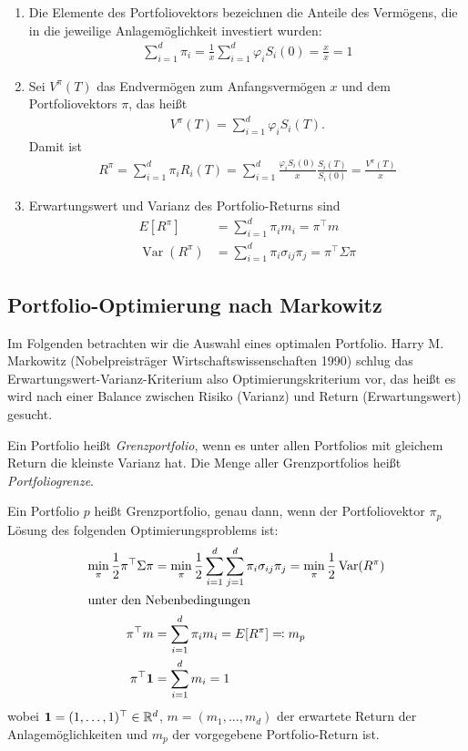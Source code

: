 \documentclass[a4paper,twoside,DIV15,BCOR12mm]{scrbook}
\DeclareMathOperator{\Var}{Var}
\begin{document}
\begin{bemerkung}
\begin{enumerate}
\item Die Elemente des Portfoliovektors bezeichnen die Anteile des Vermögens, die in die jeweilige Anlagemöglichkeit investiert wurden:
\begin{align*}
\sum_{i=1}^d \pi_i = \frac1x \sum_{i=1}^d \varphi_iS_i(0) = \frac xx = 1
\end{align*}
\item Sei $V^\pi(T)$ das Endvermögen zum Anfangsvermögen $x$ und dem Portfoliovektors $\pi$, das heißt
\begin{align*}
V^\pi(T) = \sum_{i=1}^d\varphi_iS_i(T).
\end{align*}
Damit ist
\begin{align*}
R^\pi = \sum_{i=1}^d \pi_iR_i(T) = \sum_{i=1}^d \frac{\varphi_iS_i(0)}x \frac{S_i(T)}{S_i(0)} = \frac{V^\pi(T)}x
\end{align*}
\item Erwartungswert und Varianz des Portfolio-Returns sind 
\begin{align*}
E[R^\pi] &= \sum_{i=1}^d \pi_im_i = \pi^\top m \\
\Var(R^\pi) &= \sum_{i=1}^d \pi_i\sigma_{ij}\pi_j = \pi^\top \Sigma \pi
\end{align*}
\end{enumerate}
\end{bemerkung}

\subsection{Portfolio-Optimierung nach Markowitz}
Im Folgenden betrachten wir die Auswahl eines optimalen Portfolio. Harry M. Markowitz (Nobelpreisträger Wirtschaftswissenschaften 1990) schlug das Erwartungswert-Varianz-Kriterium also Optimierungskriterium vor, das heißt es wird nach einer Balance zwischen Risiko (Varianz) und Return (Erwartungswert) gesucht.

\begin{definition}
Ein Portfolio heißt \emph{Grenzportfolio}, wenn es unter allen Portfolios mit gleichem Return die kleinste Varianz hat. Die Menge aller Grenzportfolios heißt \emph{Portfoliogrenze}.
\end{definition}

\begin{satz}
Ein Portfolio $p$ heißt Grenzportfolio, genau dann, wenn der Portfoliovektor $\pi_p$ Lösung des folgenden Optimierungsproblems ist:
\begin{align*}
\min_{\pi} \frac 12 \pi^\top \Sigma \pi &= \min_\pi \frac 12 \sum_{i=1}^d\sum_{j=1}^d \pi_i \sigma_{ij}\pi_j = \min_\pi \frac 12 \Var(R^\pi) \\
\intertext{unter den Nebenbedingungen}
\pi^\top m &= \sum_{i=1}^d \pi_im_i = E[R^\pi]\ad m_p \\
\pi^\top \mathbf 1 &= \sum_{i=1}^d m_i = 1
\end{align*}
wobei $\mathbf 1=(1,\ldots,1)^\top\in\mathbb{R}^d$, $m=(m_1,\ldots,m_d)$ der erwartete Return der Anlagemöglichkeiten und $m_p$ der vorgegebene Portfolio-Return ist.
\end{satz}
\end{document}

